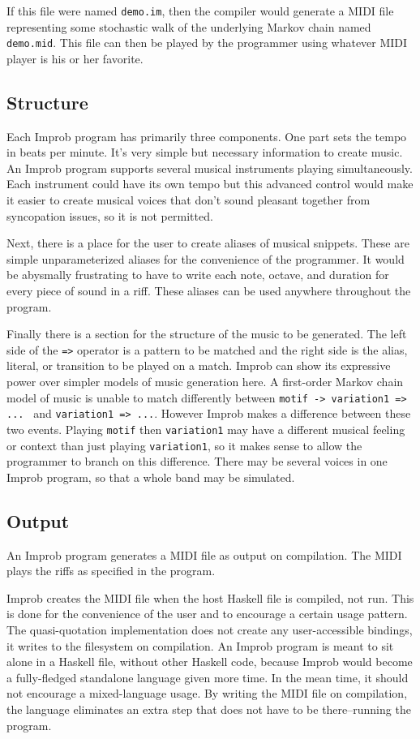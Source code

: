 \documentclass{sigplanconf-pldi15}
\begin{document}
If this file were named \texttt{demo.im}, then the compiler would generate a MIDI file representing some stochastic walk of the underlying Markov chain named \texttt{demo.mid}. This file can then be played by the programmer using whatever MIDI player is his or her favorite.

\subsection{Structure}
Each Improb program has primarily three components. One part sets the tempo in beats per minute. It's very simple but necessary information to create music. An Improb program supports several musical instruments playing simultaneously. Each instrument could have its own tempo but this advanced control would make it easier to create musical voices that don't sound pleasant together from syncopation issues, so it is not permitted.

Next, there is a place for the user to create aliases of musical snippets. These are simple unparameterized aliases for the convenience of the programmer. It would be abysmally frustrating to have to write each note, octave, and duration for every piece of sound in a riff. These aliases can be used anywhere throughout the program.

Finally there is a section for the structure of the music to be generated. The left side of the \texttt{=>} operator is a pattern to be matched and the right side is the alias, literal, or transition to be played on a match. Improb can show its expressive power over simpler models of music generation here. A first-order Markov chain model of music is unable to match differently between \texttt{motif -> variation1 => ... } and \texttt{variation1 => ...}. However Improb makes a difference between these two events. Playing \texttt{motif} then \texttt{variation1} may have a different musical feeling or context than just playing \texttt{variation1}, so it makes sense to allow the programmer to branch on this difference. There may be several voices in one Improb program, so that a whole band may be simulated.

\subsection{Output}
An Improb program generates a MIDI file as output on compilation. The MIDI plays the riffs as specified in the program.

Improb creates the MIDI file when the host Haskell file is compiled, not run. This is done for the convenience of the user and to encourage a certain usage pattern. The quasi-quotation implementation does not create any user-accessible bindings, it writes to the filesystem on compilation. An Improb program is meant to sit alone in a Haskell file, without other Haskell code, because Improb would become a fully-fledged standalone language given more time. In the mean time, it should not encourage a mixed-language usage. By writing the MIDI file on compilation, the language eliminates an extra step that does not have to be there--running the program.
\end{document}
